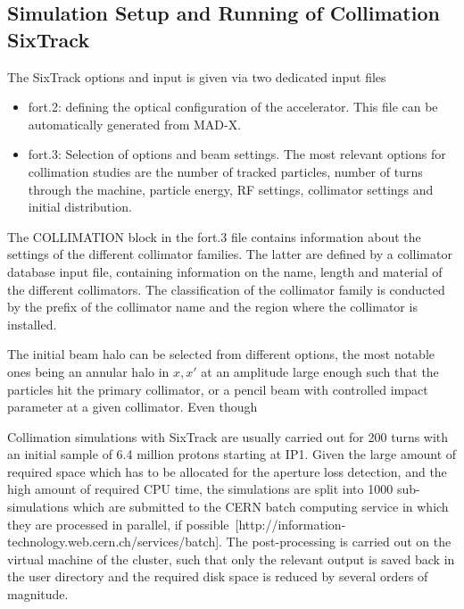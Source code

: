 \subsection{Simulation Setup and Running of Collimation SixTrack}
The SixTrack options and input is given via two dedicated input files
\begin{itemize}
  \item fort.2: defining the optical configuration of the accelerator. This file can be automatically generated from MAD-X.
  \item fort.3: Selection of options and beam settings. The most relevant options for collimation studies are the number of tracked particles, number of turns through the machine, particle energy, RF settings, collimator settings and initial distribution. 
\end{itemize}
The COLLIMATION block in the fort.3 file contains information about the settings of the different collimator families. The latter are defined by a collimator database input file, containing information on the name, length and material of the different collimators. The classification of the collimator family is conducted by the prefix of the collimator name and the region where the collimator is installed. 

The initial beam halo can be selected from different options, the most notable ones being an annular halo in $x,x'$ at an amplitude large enough such that the particles hit the primary collimator, or a pencil beam with controlled impact parameter at a given collimator. Even though 

Collimation simulations with SixTrack are usually carried out for 200 turns with an initial sample of 6.4 million protons  starting at IP1. Given the large amount of required space which has to be allocated for the aperture loss detection, and the high amount of required CPU time, the simulations are split into 1000 sub-simulations which are submitted to the CERN batch computing service in which they are processed in parallel, if possible~\cite{}[http://information-technology.web.cern.ch/services/batch]. The post-processing is carried out on the virtual machine of the cluster, such that only the relevant output is saved back in the user directory and the required disk space is reduced by several orders of magnitude. 


